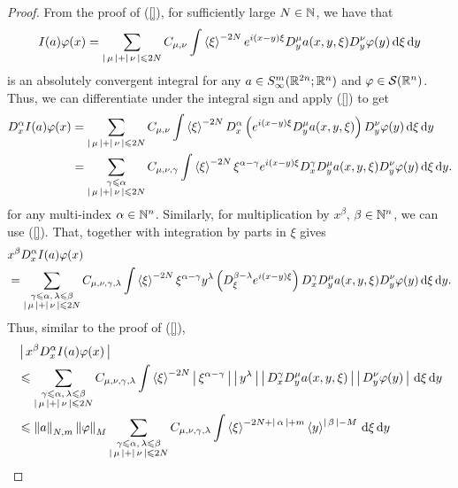 \documentclass[12pt]{article}
\begin{document}
\begin{proof}
    From the  proof of (\ref{}), for sufficiently large $N \in \N$, we have that 
    \begin{align*}
     I(a)\varphi(x)    
     &=  \sum_{\abs{\mu} + \abs{\nu} \leq 2N} C_{\mu, \nu} \int \sym[\xi]^{-2N} e^{i (x - y) \xi }  D^\mu_y a(x, y, \xi) D^\nu_{y} \varphi(y) \d[\xi] \d[y]\\
    \end{align*}
    is an absolutely convergent integral for any $a \in S^{m}_{\infty}(\R^{2n}; \R^{n})$ and $\varphi \in \sch(\R^n)$. Thus, we can differentiate under the integral sign and apply (\ref{}) to get
    \begin{align*}
    D^\alpha_x I(a)\varphi(x) 
    & = \sum_{\abs{\mu} + \abs{\nu} \leq 2N} C_{\mu, \nu} \int \sym[\xi]^{-2N}D^\alpha_x \brac{e^{i (x - y) \xi }  D^\mu_y a(x, y, \xi)} D^\nu_{y} \varphi(y) \d[\xi] \d[y]\\
    & = \sum_{\substack{\gamma \leq \alpha \\ \abs{\mu} + \abs{\nu} \leq 2N}} C_{\mu, \nu, \gamma} \int \sym[\xi]^{-2N}\xi^{\alpha - \gamma} e^{i (x - y) \xi }  D^{\gamma}_x D^\mu_y a(x, y, \xi)  D^\nu_{y} \varphi(y) \d[\xi] \d[y]. 
    \end{align*}
    for any multi-index $\alpha \in \N^n$. Similarly, for multiplication by $x^\beta$, $\beta \in \N^n$, we can use  (\ref{}). That, together with integration by parts in $\xi$ gives
    \begin{align*}
    & x^\beta D^\alpha_x I(a)\varphi(x) \\
    & = \sum_{\substack{\gamma \leq \alpha, \, \lambda \leq \beta \\ \abs{\mu} + \abs{\nu} \leq 2N}} C_{\mu, \nu, \gamma, \lambda} \int \sym[\xi]^{-2N}\xi^{\alpha - \gamma} y^\lambda \brac{D^{\beta - \lambda}_\xi e^{i (x - y) \xi }}  D^{\gamma}_x D^\mu_y a(x, y, \xi)  D^\nu_{y} \varphi(y) \d[\xi] \d[y]. 
    \end{align*}
    Thus, similar to the proof of (\ref{}), 
    \begin{align*}
    & \abs{x^\beta D^\alpha_x I(a)\varphi(x)} \\
    & \leq \sum_{\substack{\gamma \leq \alpha, \, \lambda \leq \beta \\ \abs{\mu} + \abs{\nu} \leq 2N}} C_{\mu, \nu, \gamma, \lambda} \int \sym[\xi]^{-2N} \abs{\xi^{\alpha - \gamma}} \abs{y^\lambda} \abs{D^{\gamma}_x D^\mu_y a(x, y, \xi)} \abs{ D^\nu_{y} \varphi(y)} \d[\xi] \d[y] \\
    & \leq \norm[a]_{N,m} \norm[\varphi]_M \sum_{\substack{\gamma \leq \alpha, \, \lambda \leq \beta \\ \abs{\mu} + \abs{\nu} \leq 2N}} C_{\mu, \nu, \gamma, \lambda} \int \sym[\xi]^{-2N + \abs{\alpha} + m} \sym[y]^{\abs{\beta} - M} \d[\xi] \d[y] \\

\end{align*}
\end{proof}
\end{document}
